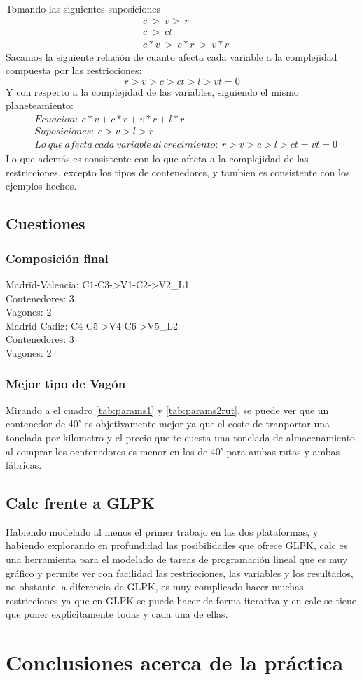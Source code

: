 \documentclass[11pt,spanish]{article}
\begin{document}
		Tomando las siguientes suposiciones
		\begin{align*}
			&c\ >\ v >\ r\\
			&c\ >\ ct\\
			&c*v\ >\ c*r\ >\ v*r
		\end{align*}
		Sacamos la siguiente relación de cuanto afecta cada variable a la complejidad compuesta por las restricciones:\\
		$$r>v>c>ct>l>vt = 0$$
		Y con respecto a la complejidad de las variables, siguiendo el mismo planeteamiento:
		\begin{align*}
			&Ecuacion:\ c*v+c*r+v*r+l*r\\
			&Suposiciones:\ c > v > l > r\\
			&Lo\ que\ afecta\ cada\ variable\ al\ crecimiento:\ r > v > c > l > ct = vt = 0
		\end{align*}
		Lo que además es consistente con lo que afecta a la complejidad de las restricciones, excepto los tipos de contenedores, y tambien es consistente con los ejemplos hechos.
		\subsection{Cuestiones}
			\subsubsection{Composición final}
			\begin{tabbing}
			Madr\=id-Valencia: C1-C3->V1-C2->V2\_L1\\
			\>Contenedores: 3\\
			\>Vagones: 2\\
			Madrid-Cadiz: C4-C5->V4-C6->V5\_L2\\
			\>Contenedores: 3\\
			\>Vagones: 2
			\end{tabbing}
			\subsubsection{Mejor tipo de Vagón}
			Mirando a el cuadro \ref{tab:params1} y \ref{tab:params2rut}, se puede ver que un contenedor de 40' es objetivamente mejor ya que el coste de tranportar una tonelada por kilometro y el precio que te cuesta una tonelada de almacenamiento al comprar los ocntenedores es menor en los de 40' para ambas rutas y ambas fábricas.
		\subsection{Calc frente a GLPK}
		Habiendo modelado al menos el primer trabajo en las dos plataformas, y habiendo explorando en profundidad las posibilidades que ofrece GLPK, calc es una herramienta para el modelado de tareas de programación lineal que es muy gráfico y permite ver con facilidad las restricciones, las variables y los resultados, no obstante, a diferencia de GLPK, es muy complicado hacer muchas restricciones ya que en GLPK se puede hacer de forma iterativa y en calc se tiene que poner explicitamente todas y cada una de ellas.
		
	\section{Conclusiones acerca de la práctica}
	\newpage
\end{document}
